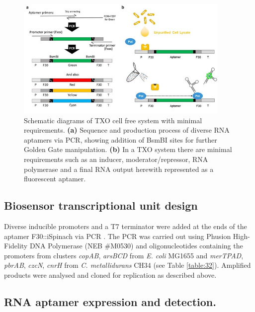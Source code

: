 \begin{figure}[ht]
\begin{center}
\hspace*{0cm}
\includegraphics[height=220px]{./chapter2/chapter/figs/Imagen1.jpg}
\end{center}
\caption{Schematic diagrams of TXO cell free system with minimal requirements. \textbf{(a)} Sequence and production process of diverse RNA aptamers via PCR, showing addition of BsmBI sites for further Golden Gate manipulation. \textbf{(b)} In a TXO system there are minimal requirements such as an inducer, moderator/repressor, RNA polymerase and a final RNA output herewith represented as a fluorescent aptamer.}
\label{NAR-fig1}
\end{figure}

\subsection*{Biosensor transcriptional unit design}

Diverse inducible promoters and a T7 terminator were added at the ends of the aptamer F30::iSpinach via PCR \citep{autour2016ispinach}. The PCR was carried out using Phusion High-Fidelity DNA Polymerase (NEB \#M0530) and oligonucleotides containing the promoters from clusters \textit{copAB}, \textit{arsBCD} from \textit{E. coli} MG1655 and \textit{merTPAD}, \textit{pbrAB}, \textit{czcN}, \textit{cnrH} from \textit{C. metallidurans} CH34 (see Table \ref{table:32}). Amplified products were analysed and cloned for replication as described above.

\subsection*{RNA aptamer expression and detection.}

